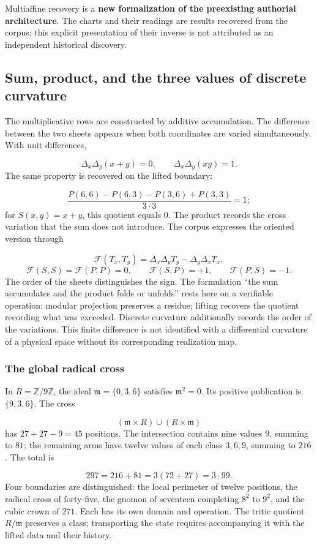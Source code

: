 Multiaffine recovery is a \textbf{new formalization of the preexisting authorial architecture}. The charts and their readings are results recovered from the corpus; this explicit presentation of their inverse is not attributed as an independent historical discovery.

\subsection{Sum, product, and the three values of discrete curvature}
The multiplicative rows are constructed by additive accumulation. The difference between the two sheets appears when both coordinates are varied simultaneously. With unit differences,

\[
\Delta_x\Delta_y(x+y)=0,
\qquad
\Delta_x\Delta_y(xy)=1.
\]
The same property is recovered on the lifted boundary:

\[
\frac{P(6,6)-P(6,3)-P(3,6)+P(3,3)}{3\cdot3}=1;
\]
for \(S(x,y)=x+y\), this quotient equals \(0\). The product records the cross variation that the sum does not introduce. The corpus expresses the oriented version through

\[
\mathcal F(T_x,T_y)=\Delta_x\Delta_yT_y-\Delta_y\Delta_xT_x,
\]
\[
\mathcal F(S,S)=\mathcal F(P,P)=0,
\qquad \mathcal F(S,P)=+1,
\qquad \mathcal F(P,S)=-1.
\]
The order of the sheets distinguishes the sign. The formulation “the sum accumulates and the product folds or unfolds” rests here on a verifiable operation: modular projection preserves a residue; lifting recovers the quotient recording what was exceeded. Discrete curvature additionally records the order of the variations. This finite difference is not identified with a differential curvature of a physical space without its corresponding realization map.

\subsubsection*{The global radical cross}
In \(R=\mathbb Z/9\mathbb Z\), the ideal \(\mathfrak m=\{0,3,6\}\) satisfies \(\mathfrak m^2=0\). Its positive publication is \(\{9,3,6\}\). The cross

\[
(\mathfrak m\times R)\cup(R\times\mathfrak m)
\]
has \(27+27-9=45\) positions. The intersection contains nine values \(9\), summing to \(81\); the remaining arms have twelve values of each class \(3,6,9\), summing to \(216\). The total is

\[
297=216+81=3(72+27)=3\cdot99.
\]
Four boundaries are distinguished: the local perimeter of twelve positions, the radical cross of forty-five, the gnomon of seventeen completing \(8^2\) to \(9^2\), and the cubic crown of \(271\). Each has its own domain and operation. The tritic quotient \(R/\mathfrak m\) preserves a class; transporting the state requires accompanying it with the lifted data and their history.

